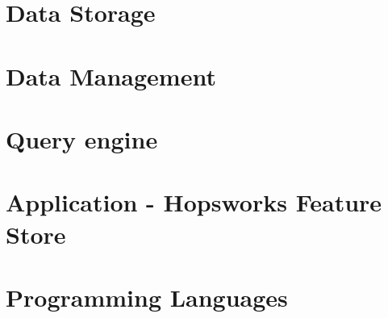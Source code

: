 

\section{Data Storage}
    \label{sec:data_storage}
    

\section{Data Management}
    \label{sec:data_management}
    

\section{Query engine}
    \label{sec:query_engine}
    

\section{Application - Hopsworks Feature Store}
    \label{sec:hopswoks_feature_store}
    

\section{Programming Languages}
    \label{sec:programming_languages}
    